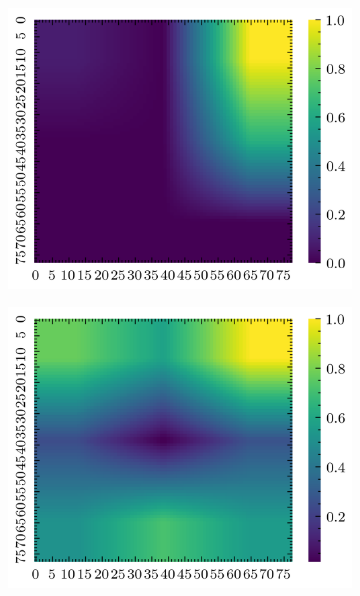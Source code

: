 \begin{figure}[H]
    \begin{subfigure}[b]{0.19\textwidth}
        \includegraphics[width=\linewidth]{../img/5/quarry/worst/grad-cam-2d-0.png}
    \end{subfigure}
    \begin{subfigure}[b]{0.19\textwidth}
        \includegraphics[width=\linewidth]{../img/5/quarry/worst/grad-cam-2d-1.png}
    \end{subfigure}  
    \begin{subfigure}[b]{0.19\textwidth}

\end{subfigure}
\end{figure}
